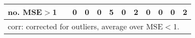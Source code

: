 {{\begin{sidewaystable}
\begin{tabular}{cc cc | cccc | cccc}
no. MSE$>$1 && 0 & 0 & 0 & 5 & 0 & 2 &0 & 0 & 0 & 2 \\[1ex] 
\hline 
\multicolumn{12}{l}{\footnotesize{corr: corrected for outliers, average over MSE$<$1.}}  \\ 
\end{tabular}
\label{tab:agarch11_pcp_var}  
\end{sidewaystable}
}
}